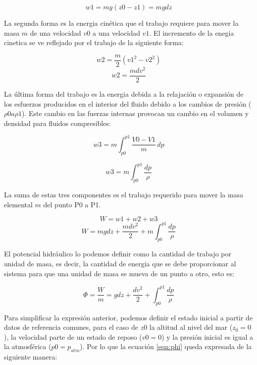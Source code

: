 \begin{equation}
w1=mg(z0-z1)=mgdz
\end{equation}

La segunda forma es la energia cinética que el trabajo requiere para mover la masa $m$ de una velocidad $v0$ a una velocidad $v1$. El incremento de la enegia cinetica se ve reflejado por el trabajo de la siguiente forma:

\begin{equation}
w2=\dfrac{m}{2}(v1^{2}-v2^{2})
\end{equation}
\begin{equation}
w2=\dfrac{mdv^{2}}{2}
\end{equation}
  
La última forma del trabajo es la energia debida a la relajación o expansión de los esfuerzos producidos en el interior del fluido debido a los cambios de presión ($\rho0 a \rho1$). Este cambio en las fuerzas internas provocan un cambio en el volumen y densidad para fluidos compresibles:

\begin{equation}
w3=m\int_{p0}^{p1}  \! \dfrac{V0-V1}{m} \, dp 
\end{equation}

\begin{equation}
w3=m\int_{p0}^{p1}  \! \dfrac{dp}{\rho}  
\end{equation}

La suma de estas tres componentes es el trabajo requerido para mover la masa elemental $m$ del punto P0 a P1.

\begin{equation}
W = w1+w2+w3
\end{equation} 
\begin{equation}
W = mgdz + \dfrac{mdv^{2}}{2} + m\int_{p0}^{p1}  \! \dfrac{dp}{\rho}
\end{equation}

El potencial hidráulico lo podemos definir como la cantidad de trabajo por unidad de masa, es decir, la cantidad de energia que se debe proporcionar al sistema para que una unidad de masa se mueva de un punto a otro, esto es:

\begin{equation}
\label{eqn:phi}
\Phi=\dfrac{W}{m}= gdz + \dfrac{dv^{2}}{2} + \int_{p0}^{p1}  \! \dfrac{dp}{\rho} 
\end{equation}

Para simplificar la expresión anterior, podemos definir el estado inicial a partir de datos de referencia comunes, para el caso de $z0$ la altitud al nivel del mar ($z_{0}=0$), la velocidad parte de un estado de reposo ($v0=0$) y la presión inicial es igual a la atmosférica ($p0=p_{atm}$). Por lo que la ecuación \ref{eqn:phi} queda expresada de la siguiente manera:

